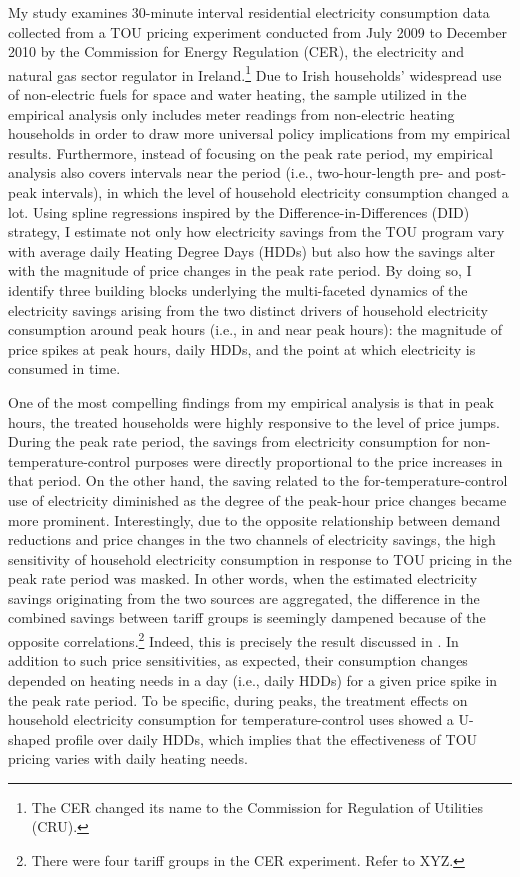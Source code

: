 My study examines 30-minute interval residential electricity consumption data collected from a TOU pricing experiment conducted from July 2009 to December 2010 by the Commission for Energy Regulation (CER), the electricity and natural gas sector regulator in Ireland.\footnote{The CER changed its name to the Commission for Regulation of Utilities (CRU).} Due to Irish households' widespread use of non-electric fuels for space and water heating, the sample utilized in the empirical analysis only includes meter readings from non-electric heating households in order to draw more universal policy implications from my empirical results. Furthermore, instead of focusing on the peak rate period, my empirical analysis also covers intervals near the period (i.e., two-hour-length pre- and post-peak intervals), in which the level of household electricity consumption changed a lot. Using spline regressions inspired by the Difference-in-Differences (DID) strategy, I estimate not only how electricity savings from the TOU program vary with average daily Heating Degree Days (HDDs) but also how the savings alter with the magnitude of price changes in the peak rate period. By doing so, I identify three building blocks underlying the multi-faceted dynamics of the electricity savings arising from the two distinct drivers of household electricity consumption around peak hours (i.e., in and near peak hours): the magnitude of price spikes at peak hours, daily HDDs, and the point at which electricity is consumed in time. 

One of the most compelling findings from my empirical analysis is that in peak hours, the treated households were highly responsive to the level of price jumps. During the peak rate period, the savings from electricity consumption for non-temperature-control purposes were directly proportional to the price increases in that period. On the other hand, the saving related to the for-temperature-control use of electricity diminished as the degree of the peak-hour price changes became more prominent. Interestingly, due to the opposite relationship between demand reductions and price changes in the two channels of electricity savings, the high sensitivity of household electricity consumption in response to TOU pricing in the peak rate period was masked. In other words, when the estimated electricity savings originating from the two sources are aggregated, the difference in the combined savings between tariff groups is seemingly dampened because of the opposite correlations.\footnote{There were four tariff groups in the CER experiment. Refer to XYZ.} Indeed, this is precisely the result discussed in \cite{Peaking-Interest:How-Awareness-Drives-the-Effectiveness-of-Time-of-Use-Electricity-Pricing_Prest_2020}. In addition to such price sensitivities, as expected, their consumption changes depended on heating needs in a day (i.e., daily HDDs) for a given price spike in the peak rate period. To be specific, during peaks, the treatment effects on household electricity consumption for temperature-control uses showed a U-shaped profile over daily HDDs, which implies that the effectiveness of TOU pricing varies with daily heating needs. 

